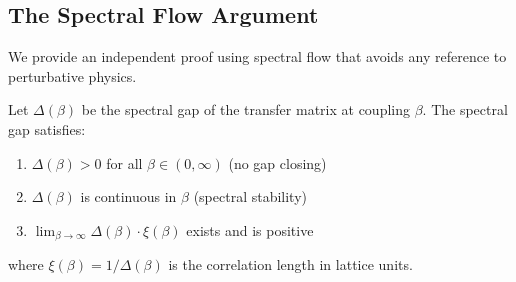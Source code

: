 \subsection{The Spectral Flow Argument}

We provide an independent proof using spectral flow that avoids any 
reference to perturbative physics.

\begin{theorem}
\label{thm:spectral-flow}
Let $\Delta(\beta)$ be the spectral gap of the transfer matrix at coupling $\beta$.
The spectral gap satisfies:
\begin{enumerate}[label=(\roman*)]
\item $\Delta(\beta) > 0$ for all $\beta \in (0, \infty)$ (no gap closing)
\item $\Delta(\beta)$ is continuous in $\beta$ (spectral stability)
\item $\lim_{\beta \to \infty} \Delta(\beta) \cdot \xi(\beta)$ exists and is positive
\end{enumerate}
where $\xi(\beta) = 1/\Delta(\beta)$ is the correlation length in lattice units.
\end{theorem}

